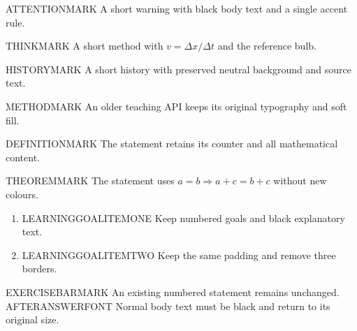 \raggedright
\newsavebox{\RefinementMathBox}
\newsavebox{\RefinementChoicesBox}
\mainmatter
{}
\begin{AttentionBox}
ATTENTIONMARK A short warning with black body text and a single accent rule.
\end{AttentionBox}
\begin{ThinkBox}
THINKMARK A short method with $v=\Delta x/\Delta t$ and the reference bulb.
\end{ThinkBox}
\begin{HistoryBox}
HISTORYMARK A short history with preserved neutral background and source text.
\end{HistoryBox}
\begin{MethodBox}
METHODMARK An older teaching API keeps its original typography and soft fill.
\end{MethodBox}
\clearpage
{}
\begin{definitionbox}[DEFINITIONTITLE]
\raggedright DEFINITIONMARK The statement retains its counter and all mathematical content.
\end{definitionbox}
\begin{theorembox}[THEOREMTITLE]
THEOREMMARK The statement uses $a=b\Rightarrow a+c=b+c$ without new colours.
\end{theorembox}
\begin{LearningGoals}
\begin{enumerate}[label=\arabic*.,leftmargin=13pt]
\item LEARNINGGOALITEMONE Keep numbered goals and black explanatory text.
\item LEARNINGGOALITEMTWO Keep the same padding and remove three borders.
\end{enumerate}
\end{LearningGoals}
\clearpage
{}
\begin{exercise}[REFEX]{}
EXERCISEBARMARK An existing numbered statement remains unchanged.
AFTERANSWERFONT Normal body text must be black and return to its original size.
\end{exercise}
